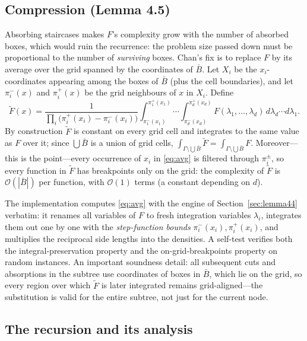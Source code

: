 \documentclass[11pt,a4paper]{article}
\theoremstyle{remark}
\newcommand{\Oh}{\mathcal{O}}
\begin{document}
\subsection{Compression (Lemma 4.5)}
\label{sec:compress}

Absorbing staircases makes $F$'s complexity grow with the number of absorbed
boxes, which would ruin the recurrence: the problem size passed down must be
proportional to the number of \emph{surviving} boxes.  Chan's fix is to
replace $F$ by its average over the grid spanned by the coordinates of
$\bar B$.  Let $X_i$ be the $x_i$-coordinates appearing among the boxes of
$\bar B$ (plus the cell boundaries), and let $\pi_i^-(x)$ and $\pi_i^+(x)$ be
the grid neighbours of $x$ in $X_i$.  Define
\begin{equation}
\tilde F(x)=\frac{1}{\prod_i\bigl(\pi_i^+(x_i)-\pi_i^-(x_i)\bigr)}
\int_{\pi_1^-(x_1)}^{\pi_1^+(x_1)}\!\!\cdots\int_{\pi_d^-(x_d)}^{\pi_d^+(x_d)}
F(\lambda_1,\dots,\lambda_d)\,d\lambda_d\cdots d\lambda_1 .
\label{eq:avg}
\end{equation}
By construction $\tilde F$ is constant on every grid cell and integrates to
the same value as $F$ over it; since $\bigcup\bar B$ is a union of grid
cells, $\int_{\Gamma\setminus\bigcup\bar B}\tilde F=
\int_{\Gamma\setminus\bigcup\bar B}F$.  Moreover---this is the point---every
occurrence of $x_i$ in \eqref{eq:avg} is filtered through $\pi_i^\pm$, so
every function in $\tilde F$ has breakpoints only on the grid: the complexity
of $\tilde F$ is $\Oh(|\bar B|)$ per function, with $\Oh(1)$ terms (a
constant depending on $d$).

The implementation computes \eqref{eq:avg} with the engine of
Section~\ref{sec:lemma44} verbatim: it renames all variables of $F$ to fresh
integration variables $\lambda_i$, integrates them out one by one with the
\emph{step-function bounds} $\pi_i^-(x_i),\pi_i^+(x_i)$, and multiplies the
reciprocal side lengths into the densities.  A self-test verifies both the
integral-preservation property and the on-grid-breakpoints property on random
instances.  An important soundness detail: all subsequent cuts and
absorptions in the subtree use coordinates of boxes in $\bar B$, which lie on
the grid, so every region over which $\tilde F$ is later integrated remains
grid-aligned---the substitution is valid for the entire subtree, not just for
the current node.

\subsection{The recursion and its analysis}
\end{document}
